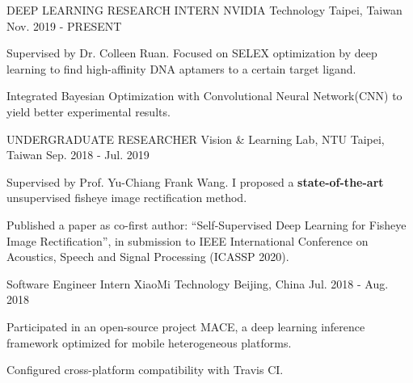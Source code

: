 

\begin{cventries}

\cventry
    {DEEP LEARNING RESEARCH INTERN} %
    {NVIDIA Technology} %
    {Taipei, Taiwan} %
    {Nov. 2019 - PRESENT} %
    {
      \begin{cvitems} %
        \item {Supervised by Dr. Colleen Ruan. Focused on SELEX optimization by deep learning to find high-affinity DNA aptamers to a certain target ligand.}
        \item {Integrated Bayesian Optimization with Convolutional Neural Network(CNN) to yield better experimental results.}
      \end{cvitems}
    }

\cventry
    {UNDERGRADUATE RESEARCHER} %
    {Vision \& Learning Lab, NTU} %
    {Taipei, Taiwan} %
    {Sep. 2018 - Jul. 2019} %
    {
      \begin{cvitems} %
        \item {Supervised by Prof. Yu-Chiang Frank Wang. I proposed a \textbf{state-of-the-art} unsupervised fisheye image rectification method.}
        \item {Published a paper as co-first author: “Self-Supervised Deep Learning for Fisheye Image Rectification”, in submission to IEEE International Conference on Acoustics, Speech and Signal Processing (ICASSP 2020).}
      \end{cvitems}
    }



  \cventry
    {Software Engineer Intern} %
    {XiaoMi Technology} %
    {Beijing, China} %
    {Jul. 2018 - Aug. 2018} %
    {
      \begin{cvitems} %
        \item {Participated in an open-source project MACE, a deep learning inference framework optimized for mobile heterogeneous platforms.}
        \item {Configured cross-platform compatibility with Travis CI.}
      \end{cvitems}
    }

\end{cventries}
